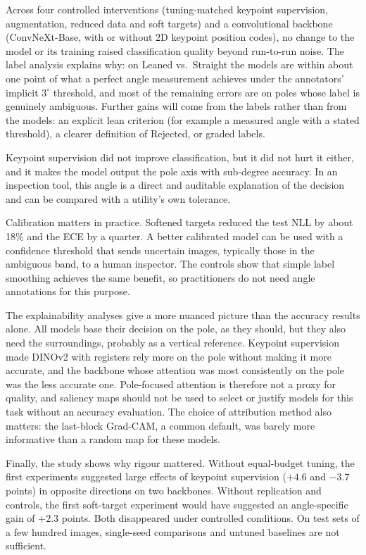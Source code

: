 \documentclass[11pt]{article}
\begin{document}
Across four controlled interventions (tuning-matched keypoint supervision, augmentation, reduced data and soft targets) and a convolutional backbone (ConvNeXt-Base, with or without 2D keypoint position codes), no change to the model or its training raised classification quality
beyond run-to-run noise. The label analysis explains why: on Leaned vs.\ Straight the models are within about
one point of what a perfect angle measurement achieves under the annotators' implicit $3^\circ$ threshold, and
most of the remaining errors are on poles whose label is genuinely ambiguous. Further gains will come from the
labels rather than from the models: an explicit lean criterion (for example a measured angle with a stated
threshold), a clearer definition of Rejected, or graded labels.

Keypoint supervision did not improve classification, but it did not hurt it either, and it makes the model
output the pole axis with sub-degree accuracy. In an inspection tool, this angle is a direct and auditable
explanation of the decision and can be compared with a utility's own tolerance.

Calibration matters in practice. Softened targets reduced the test NLL by about 18\% and the ECE by a quarter. A better calibrated model can be
used with a confidence threshold that sends uncertain images, typically those in the ambiguous band, to a
human inspector. The controls show that simple label smoothing achieves the same benefit, so practitioners
do not need angle annotations for this purpose.

The explainability analyses give a more nuanced picture than the accuracy results alone. All models base their
decision on the pole, as they should, but they also need the surroundings, probably as a vertical reference.
Keypoint supervision made DINOv2 with registers rely more on the pole without making it more accurate, and the
backbone whose attention was most consistently on the pole was the less accurate one. Pole-focused attention
is therefore not a proxy for quality, and saliency maps should not be used to select or justify models for this
task without an accuracy evaluation. The choice of attribution method also matters: the last-block Grad-CAM,
a common default, was barely more informative than a random map for these models.

Finally, the study shows why rigour mattered. Without equal-budget tuning, the first experiments suggested large effects of keypoint supervision ($+4.6$ and
$-3.7$ points) in opposite directions on two backbones. Without replication and controls, the first soft-target experiment would have
suggested an angle-specific gain of $+2.3$ points. Both disappeared under controlled conditions. On test sets
of a few hundred images, single-seed comparisons and untuned baselines are not sufficient.
\end{document}
